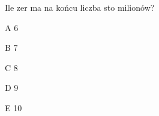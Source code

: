 \begin{tresc}
Ile zer ma na końcu liczba sto milionów?
\end{tresc}
\begin{wariant}{A} 6 \end{wariant}
\begin{wariant}{B} 7 \end{wariant}
\begin{wariant}{C} 8 \end{wariant}
\begin{wariant}{D} 9 \end{wariant}
\begin{wariant}{E} 10 \end{wariant}
